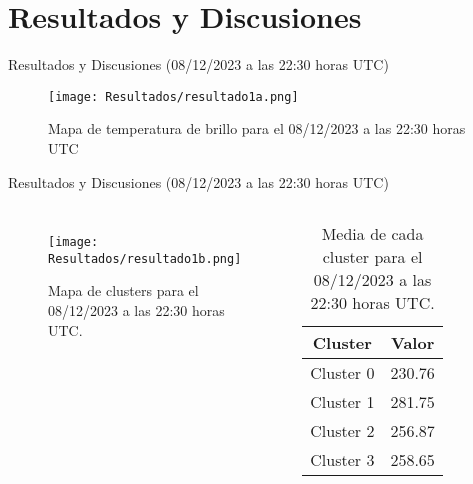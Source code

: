 \documentclass[aspectratio=169,xcolor=dvipsnames]{beamer}
\begin{document}
\section{Resultados y Discusiones}
\begin{frame}{Resultados y Discusiones (08/12/2023 a las 22:30 horas UTC)}
\begin{figure}
    \centering
    \texttt{[image: Resultados/resultado1a.png]}
    \caption{Mapa de temperatura de brillo para el 08/12/2023 a las 22:30 horas UTC}
    \label{fig6}
\end{figure}
\end{frame}
\begin{frame}{Resultados y Discusiones (08/12/2023 a las 22:30 horas UTC)}
    \begin{columns}

        \begin{figure}
            \centering
            \texttt{[image: Resultados/resultado1b.png]}
            {\footnotesize %
            \caption{Mapa de clusters para el 08/12/2023 a las 22:30 horas UTC.}
            \label{fig7}
            }
        \end{figure}

        \centering
        \begin{table}[h!]
            \centering
            {\footnotesize %
            \begin{tabular}{|c|c|}
                \hline
                \textbf{Cluster} & \textbf{Valor} \\
                \hline
                Cluster 0 & 230.76 \\
                Cluster 1 & 281.75 \\
                Cluster 2 & 256.87 \\
                Cluster 3 & 258.65 \\                
                \hline
            \end{tabular}
            \caption{Media de cada cluster para el 08/12/2023 a las 22:30 horas UTC.}
            }
        \end{table}

    \end{columns}
\end{frame}
\end{document}
